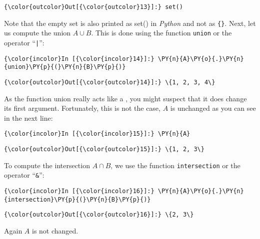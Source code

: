 \begin{Verbatim}[commandchars=\\\{\}]
{\color{outcolor}Out[{\color{outcolor}13}]:} set()
\end{Verbatim}
Note that the empty set is also printed as set() in \textsl{Python} and not as \texttt{\{\}}.
Next, let us compute the union \(A \cup B\). This is done using the
function \texttt{union} or the operator ``\texttt{|}'':

\begin{Verbatim}[commandchars=\\\{\}]
{\color{incolor}In [{\color{incolor}14}]:} \PY{n}{A}\PY{o}{.}\PY{n}{union}\PY{p}{(}\PY{n}{B}\PY{p}{)}
\end{Verbatim}


\begin{Verbatim}[commandchars=\\\{\}]
{\color{outcolor}Out[{\color{outcolor}14}]:} \{1, 2, 3, 4\}
\end{Verbatim}
            
As the function union really acts like a , you might
suspect that it does change its first argument. Fortunately, this is not
the case, \(A\) is unchanged as you can see in the next line:

\begin{Verbatim}[commandchars=\\\{\}]
{\color{incolor}In [{\color{incolor}15}]:} \PY{n}{A}
\end{Verbatim}

\begin{Verbatim}[commandchars=\\\{\}]
{\color{outcolor}Out[{\color{outcolor}15}]:} \{1, 2, 3\}
\end{Verbatim}            
To compute the intersection \(A \cap B\), we use the function \texttt{intersection} or the operator ``\texttt{\&}'':

\begin{Verbatim}[commandchars=\\\{\}]
{\color{incolor}In [{\color{incolor}16}]:} \PY{n}{A}\PY{o}{.}\PY{n}{intersection}\PY{p}{(}\PY{n}{B}\PY{p}{)}
\end{Verbatim}

\begin{Verbatim}[commandchars=\\\{\}]
{\color{outcolor}Out[{\color{outcolor}16}]:} \{2, 3\}
\end{Verbatim}       
Again \(A\) is not changed.

